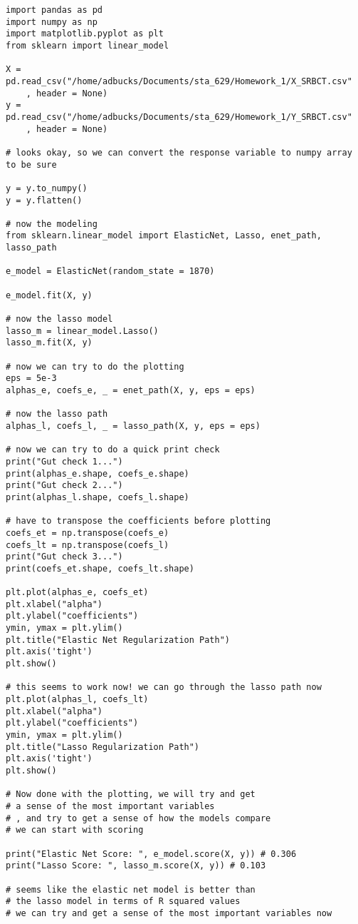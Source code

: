 \documentclass[12pt, letterpaper]{article}
\begin{document}
\begin{verbatim} 
import pandas as pd 
import numpy as np 
import matplotlib.pyplot as plt 
from sklearn import linear_model 

X = pd.read_csv("/home/adbucks/Documents/sta_629/Homework_1/X_SRBCT.csv"
	, header = None)
y = pd.read_csv("/home/adbucks/Documents/sta_629/Homework_1/Y_SRBCT.csv"
	, header = None)

# looks okay, so we can convert the response variable to numpy array to be sure 

y = y.to_numpy() 
y = y.flatten()

# now the modeling 
from sklearn.linear_model import ElasticNet, Lasso, enet_path, lasso_path 

e_model = ElasticNet(random_state = 1870)

e_model.fit(X, y)

# now the lasso model 
lasso_m = linear_model.Lasso()
lasso_m.fit(X, y)

# now we can try to do the plotting 
eps = 5e-3  
alphas_e, coefs_e, _ = enet_path(X, y, eps = eps) 

# now the lasso path 
alphas_l, coefs_l, _ = lasso_path(X, y, eps = eps)

# now we can try to do a quick print check 
print("Gut check 1...") 
print(alphas_e.shape, coefs_e.shape)
print("Gut check 2...")
print(alphas_l.shape, coefs_l.shape)

# have to transpose the coefficients before plotting 
coefs_et = np.transpose(coefs_e)
coefs_lt = np.transpose(coefs_l)
print("Gut check 3...")
print(coefs_et.shape, coefs_lt.shape) 

plt.plot(alphas_e, coefs_et)
plt.xlabel("alpha") 
plt.ylabel("coefficients") 
ymin, ymax = plt.ylim()
plt.title("Elastic Net Regularization Path") 
plt.axis('tight')
plt.show() 

# this seems to work now! we can go through the lasso path now 
plt.plot(alphas_l, coefs_lt)
plt.xlabel("alpha")
plt.ylabel("coefficients")
ymin, ymax = plt.ylim() 
plt.title("Lasso Regularization Path") 
plt.axis('tight') 
plt.show() 

# Now done with the plotting, we will try and get 
# a sense of the most important variables
# , and try to get a sense of how the models compare 
# we can start with scoring 

print("Elastic Net Score: ", e_model.score(X, y)) # 0.306
print("Lasso Score: ", lasso_m.score(X, y)) # 0.103 

# seems like the elastic net model is better than 
# the lasso model in terms of R squared values 
# we can try and get a sense of the most important variables now 


\end{verbatim}
\end{document}
